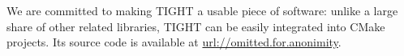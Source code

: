 We are committed to making TIGHT a usable piece of software: unlike a large share of other related libraries, TIGHT can be easily integrated into CMake projects. Its source code is available at \url{url://omitted.for.anonimity}.







